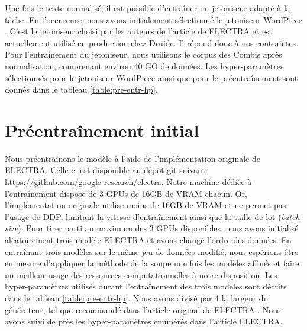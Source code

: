 \documentclass[12pt,twoside,maitrise]{dms}
\theoremstyle{definition}
\numberwithin{equation}{section}
\numberwithin{table}{chapter}
\numberwithin{figure}{chapter}
\begin{document}
Une fois le texte normalisé, il est possible d'entraîner un jetoniseur adapté à
la tâche. En l'occurence, nous avons initialement sélectionné le jetoniseur
WordPiece \cite{wu2016googlesneuralmachinetranslation}. C'est le jetoniseur
choisi par les auteurs de l'article de ELECTRA et est actuellement utilisé en
production chez Druide. Il répond donc à nos contraintes. Pour l'entraînement
du jetoniseur, nous utilisons le corpus des Combis après normalisation,
comprenant environ 40 GO de données. Les hyper-paramètres sélectionnés pour le
jetoniseur WordPiece ainsi que pour le préentraînement sont donnés dans le
tableau \ref{table:pre-entr-hp}.\\

\section{Préentraînement initial}
Nous préentraînons le modèle à l'aide de l'implémentation originale de ELECTRA.
Celle-ci est disponible au dépôt git suivant:
\url{https://github.com/google-research/electra}. Notre machine dédiée à
l'entraînement dispose de 3 GPUs de 16GB de VRAM chacun. Or, l'implémentation
originale utilise moins de 16GB de VRAM et ne permet pas l'usage de DDP,
limitant la vitesse d'entraînement ainsi que la taille de lot (\textit{batch
	size}). Pour tirer parti au maximum des 3 GPUs disponibles, nous avons
initialisé aléatoirement trois modèle ELECTRA et avons changé l'ordre des
données. En entraînant trois modèles sur le même jeu de données modifié, nous
espérions être en mesure d'appliquer la méthode de la soupe \cite{soup} une
fois les modèles affinés et faire un meilleur usage des ressources
computationnelles à notre disposition. Les hyper-paramètres utilisés durant
l'entraînement des trois modèles sont décrits dans le tableau
\ref{table:pre-entr-hp}. Nous avons divisé par 4 la largeur du générateur, tel
que recommandé dans l'article original de ELECTRA
\cite{clark2020electrapretrainingtextencoders}. Nous avons suivi de près les
hyper-paramètres énumérés dans l'article ELECTRA.
\end{document}
